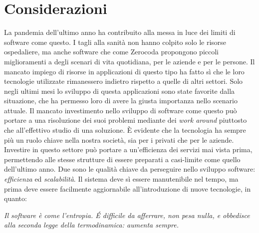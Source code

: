 \section{Considerazioni}
La pandemia dell'ultimo anno ha contribuito alla messa in luce dei limiti di software come questo. I tagli alla sanità non hanno colpito solo le risorse ospedaliere, ma anche software che come Zerocoda propongono piccoli miglioramenti a degli scenari di vita quotidiana, per le aziende e per le persone. Il mancato impiego di risorse in applicazioni di questo tipo ha fatto sì che le loro tecnologie utilizzate rimanessero indietro rispetto a quelle di altri settori. Solo negli ultimi mesi lo sviluppo di questa applicazioni sono state favorite dalla situazione, che ha permesso loro di avere la giusta importanza nello scenario attuale. Il mancato investimento nello sviluppo di software come questo può portare a una risoluzione dei suoi problemi mediante dei \emph{work around} piuttosto che all'effettivo studio di una soluzione. È evidente che la tecnologia ha sempre più un ruolo chiave nella nostra società, sia per i privati che per le aziende. Investire in questo settore può portare a un'efficienza dei servizi mai vista prima, permettendo alle stesse strutture di essere preparati a casi-limite come quello dell'ultimo anno. Due sono le qualità chiave da perseguire nello sviluppo software: \emph{efficienza} ed \emph{scalabilità}. Il sistema deve sì essere manutenibile nel tempo, ma prima deve essere facilmente aggiornabile all'introduzione di nuove tecnologie, in quanto:
\begin{center}
    \textit{Il software è come l'entropia. É difficile da afferrare, non pesa nulla, e obbedisce alla seconda legge della termodinamica: aumenta sempre.}
\end{center}